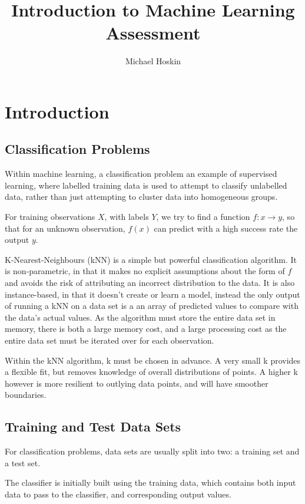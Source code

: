 \documentclass[11pt]{article} %
\title{\vspace{-0cm}Introduction to Machine Learning Assessment}
\author{Michael Hoskin}
\date{} %
\begin{document}
\vspace{-5mm}
\maketitle

\section{Introduction}


\subsection{Classification Problems}

Within machine learning, a classification problem an example of supervised learning, where labelled training data is used to attempt to classify unlabelled data, rather than just attempting to cluster data into homogeneous groups. 

For training observations $X$, with labels $Y$, we try to find a function $f : x \rightarrow y$, so that for an unknown observation, $f(x)$ can predict with a high success rate the output $y$.

K-Nearest-Neighbours (kNN) is a simple but powerful classification algorithm. It is non-parametric, in that it makes no explicit assumptions about the form of $f$ and avoids the risk of attributing an incorrect distribution to the data. It is also instance-based, in that it doesn't create or learn a model, instead the only output of running a kNN on a data set is a an array of predicted values to compare with the data's actual values. As the algorithm must store the entire data set in memory, there is both a large memory cost, and a large processing cost as the entire data set must be iterated over for each observation. 

Within the kNN algorithm, k must be chosen in advance. A very small k provides a flexible fit, but removes knowledge of overall distributions of points. A higher k however is more resilient to outlying data points, and will have smoother boundaries. 

\subsection{Training and Test Data Sets}

For classification problems, data sets are usually split into two: a training set and a test set.

The classifier is initially built using the training data, which contains both input data to pass to the classifier, and corresponding output values.
\end{document}
